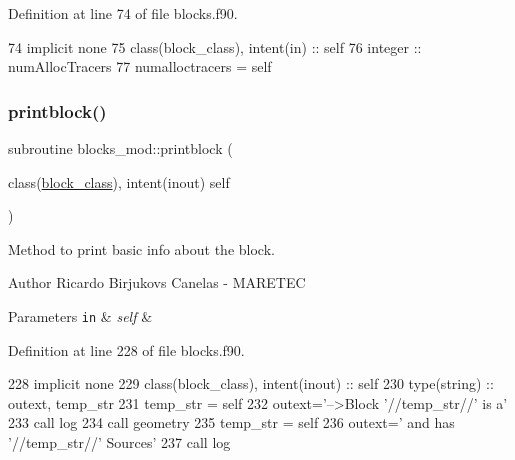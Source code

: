 Definition at line 74 of file blocks.\+f90.


\begin{DoxyCode}
74     \textcolor{keywordtype}{implicit none}
75     \textcolor{keywordtype}{class}(block\_class), \textcolor{keywordtype}{intent(in)} :: self
76     \textcolor{keywordtype}{integer} :: numAllocTracers
77     numalloctracers = self%
\end{DoxyCode}
\mbox{\label{namespaceblocks__mod_a6eab8b323cb15dcecb5c6b0c31b4e246}} 
\subsubsection{\texorpdfstring{printblock()}{printblock()}}
{\footnotesize\ttfamily subroutine blocks\+\_\+mod\+::printblock (\begin{DoxyParamCaption}\item[{class(\mbox{\hyperlink{structblocks__mod_1_1block__class}{block\+\_\+class}}), intent(inout)}]{self }\end{DoxyParamCaption})\hspace{0.3cm}{\ttfamily [private]}}



Method to print basic info about the block. 

\begin{DoxyAuthor}{Author}
Ricardo Birjukovs Canelas -\/ M\+A\+R\+E\+T\+EC
\end{DoxyAuthor}

\begin{DoxyParams}[1]{Parameters}
\mbox{\tt in}  & {\em self} & \\
\hline
\end{DoxyParams}


Definition at line 228 of file blocks.\+f90.


\begin{DoxyCode}
228     \textcolor{keywordtype}{implicit none}
229     \textcolor{keywordtype}{class}(block\_class), \textcolor{keywordtype}{intent(inout)} :: self
230     \textcolor{keywordtype}{type}(string) :: outext, temp\_str
231     temp\_str = self%
232     outext=\textcolor{stringliteral}{'-->Block '}//temp\_str//\textcolor{stringliteral}{' is a'}
233     \textcolor{keyword}{call }log%
234     \textcolor{keyword}{call }geometry%
235     temp\_str = self%
236     outext=\textcolor{stringliteral}{'      and has '}//temp\_str//\textcolor{stringliteral}{' Sources'}
237     \textcolor{keyword}{call }log%
\end{DoxyCode}
\mbox{\label{namespaceblocks__mod_a10f356706988c45a255922fe70851488}} 
